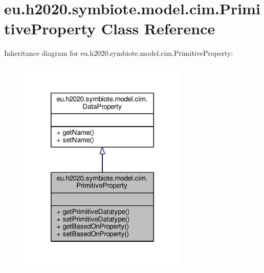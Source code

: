 \hypertarget{classeu_1_1h2020_1_1symbiote_1_1model_1_1cim_1_1PrimitiveProperty}{}\section{eu.\+h2020.\+symbiote.\+model.\+cim.\+Primitive\+Property Class Reference}
\label{classeu_1_1h2020_1_1symbiote_1_1model_1_1cim_1_1PrimitiveProperty}


Inheritance diagram for eu.\+h2020.\+symbiote.\+model.\+cim.\+Primitive\+Property\+:\nopagebreak
\begin{figure}[H]
\begin{center}
\leavevmode
\includegraphics[width=228pt]{classeu_1_1h2020_1_1symbiote_1_1model_1_1cim_1_1PrimitiveProperty__inherit__graph}
\end{center}
\end{figure}


